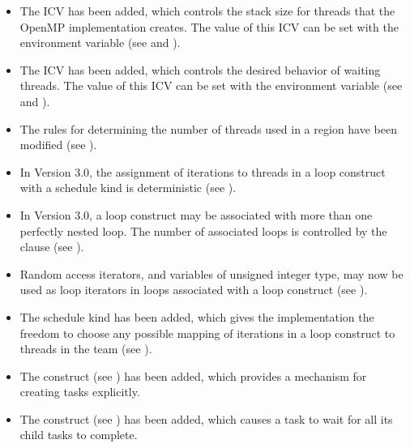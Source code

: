 \begin{itemize}
\item The  ICV has been added, which controls the stack size 
      for threads that the OpenMP implementation creates. The value of this ICV 
      can be set with the  environment variable 
      (see  and ).

\item The  ICV has been added, which controls the desired 
      behavior of waiting threads. The value of this ICV can be set with the 
       environment variable 
      (see  and ).

\item The rules for determining the number of threads used in a  
      region have been modified (see 
      ).

\item In Version 3.0, the assignment of iterations to threads in a loop construct 
      with a  schedule kind is deterministic (see 
      ).

\item In Version 3.0, a loop construct may be associated with more than one 
      perfectly nested loop. The number of associated loops is controlled by the 
       clause (see ).

\item Random access iterators, and variables of unsigned integer type, may now 
      be used as loop iterators in loops associated with a loop construct 
      (see ).

\item The schedule kind  has been added, which gives the implementation 
      the freedom to choose any possible mapping of iterations in a loop construct 
      to threads in the team (see ).

\item The  construct (see ) has been
      added, which provides a mechanism for creating tasks explicitly.

\item The  construct (see ) 
      has been added, which causes a task to wait for all its child tasks to 
      complete.


\end{itemize}
